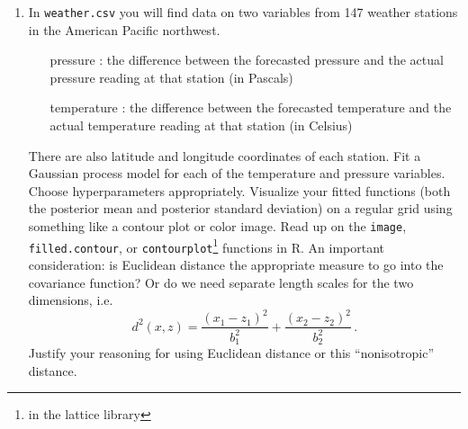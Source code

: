 \documentclass{homework}
\begin{document}
\begin{enumerate}[label=(\Alph*)]
\item In \verb|weather.csv| you will find data on two variables from 147 weather stations in the American Pacific northwest.
\begin{itemize}
\item[pressure]: the difference between the forecasted pressure and the actual pressure reading at that station (in Pascals)
\item[temperature]: the difference between the forecasted temperature and the actual temperature reading at that station (in Celsius)
\end{itemize}
There are also latitude and longitude coordinates of each  station.  Fit a Gaussian process model for each of the temperature and pressure variables.  Choose hyperparameters appropriately.  Visualize your fitted functions (both the posterior mean and posterior standard deviation) on a regular grid using something like a contour plot or color image.  Read up on the \verb|image|, \verb|filled.contour|, or \verb|contourplot|\footnote{in the lattice library} functions in R.  An important consideration: is Euclidean distance the appropriate measure to go into the covariance function?  Or do we need separate length scales for the two dimensions, i.e.
$$
d^2(x, z) = \frac{(x_1 - z_1)^2}{b_1^2} +  \frac{(x_2 - z_2)^2}{b_2^2} \, .
$$
Justify your reasoning for using Euclidean distance or this ``nonisotropic'' distance.


%
%

\end{enumerate}
\end{document}
